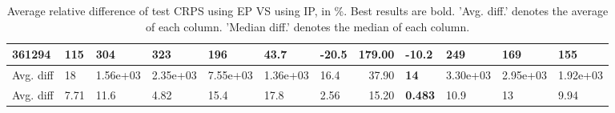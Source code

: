 \begin{table}[ht!]
\begin{tabular}{lllllllrllll}
  361294 & 115 & 304 & 323 & 196 & 43.7 & \textbf{-20.5} & 179.00 & -10.2 & 249 & 169 & 155 \\ 
   \hline
Avg. diff & 18 & 1.56e+03 & 2.35e+03 & 7.55e+03 & 1.36e+03 & 16.4 & 37.90 & \textbf{14} & 3.30e+03 & 2.95e+03 & 1.92e+03 \\ 
  Avg. diff & 7.71 & 11.6 & 4.82 & 15.4 & 17.8 & 2.56 & 15.20 & \textbf{0.483} & 10.9 & 13 & 9.94 \\ 
   \hline
\hline
\end{tabular}
\endgroup
\caption{Average relative difference of test CRPS using EP VS using IP, in \%. 
                  Best results are bold. 
                  'Avg. diff.' denotes the average of each column.
                  'Median diff.' denotes the median of each column.} 
\label{TABLES/table_results_CRPS_clustering_num_and_cat_features_EP_VS_IP}
\end{table}
